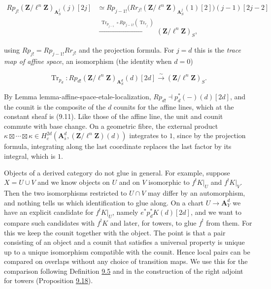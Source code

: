 \documentclass[11pt]{article}
\begin{document}
\[
\begin{aligned}
Rp_{j!}(\mathbf Z/\ell^n\mathbf Z)_{\mathbf A^j_S}(j)[2j]
&\simeq Rp_{j-1!}\bigl(Rr_{j!}(\mathbf Z/\ell^n\mathbf Z)_{\mathbf A^j_S}(1)[2]\bigr)(j-1)[2j-2]\\
&\xrightarrow{\ \operatorname{Tr}_{p_{j-1}}\circ Rp_{j-1!}(\operatorname{Tr}_{r_j})\ }
(\mathbf Z/\ell^n\mathbf Z)_S,
\end{aligned}
\]

using \(Rp_{j!}=Rp_{j-1!}Rr_{j!}\) and the projection formula. For \(j=d\) this is the \emph{trace map of affine space}, an isomorphism (the identity when \(d=0\))

\[
\operatorname{Tr}_{p_d}:Rp_{d!}(\mathbf Z/\ell^n\mathbf Z)_{\mathbf A^d_S}(d)[2d]
\xrightarrow{\sim}(\mathbf Z/\ell^n\mathbf Z)_{S}.
\tag{9.11}
\]

By Lemma lemma-affine-space-etale-localization, \(Rp_{d!}\dashv
p_d^*(-)(d)[2d]\), and the counit is the composite of the \(d\) counits for the affine lines, which at the constant sheaf is (9.11). Like those of the affine line, the unit and counit commute with base change. On a geometric fibre, the external product \(\kappa\boxtimes\cdots\boxtimes\kappa\in
H_c^{2d}(\mathbf A^d_{\bar s},(\mathbf Z/\ell^n\mathbf Z)(d))\) integrates to \(1\), since by the projection formula, integrating along the last coordinate replaces the last factor by its integral, which is \(1\).

Objects of a derived category do not glue in general. For example, suppose \(X=U\cup V\) and we know objects on \(U\) and on \(V\) isomorphic to \(f^!K|_U\) and \(f^!K|_V\). Then the two isomorphisms restricted to \(U\cap V\) may differ by an automorphism, and nothing tells us which identification to glue along. On a chart \(U\to\mathbf A^d_Y\) we have an explicit candidate for \(f^!K|_U\), namely \(e^*p_d^*K(d)[2d]\), and we want to compare such candidates with \(f^!K\) and later, for towers, to glue \(f^!\) from them. For this we keep the counit together with the object. The point is that a pair consisting of an object and a counit that satisfies a universal property is unique up to a unique isomorphism compatible with the counit. Hence local pairs can be compared on overlaps without any choice of transition maps. We use this for the comparison following Definition \hyperref[bp17]{9.5} and in the construction of the right adjoint for towers (Proposition \hyperref[bp58]{9.18}).
\end{document}
